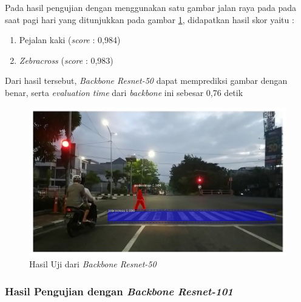 Pada hasil pengujian dengan menggunakan satu gambar jalan raya pada pada saat pagi hari yang ditunjukkan pada gambar \ref{fig:hasil-resnet50}, didapatkan hasil skor yaitu :
\begin{enumerate}[nolistsep]
	\item Pejalan kaki (\textit{score} : 0,984)
	\item \textit{Zebracross} (\textit{score} : 0,983)
\end{enumerate}
Dari hasil tersebut, \textit{Backbone Resnet-50} dapat memprediksi gambar dengan benar, serta \textit{evaluation time} dari \textit{backbone} ini sebesar 0,76 detik
\begin{figure}[H] 
	\centering
	\includegraphics[scale=0.3]{gambar/hasil/resnet-50_fajar_800.png}
	\caption{Hasil Uji dari \textit{Backbone Resnet-50}}
	\label{fig:hasil-resnet50}
\end{figure}

\subsubsection{Hasil Pengujian dengan \textit{Backbone Resnet-101}}

